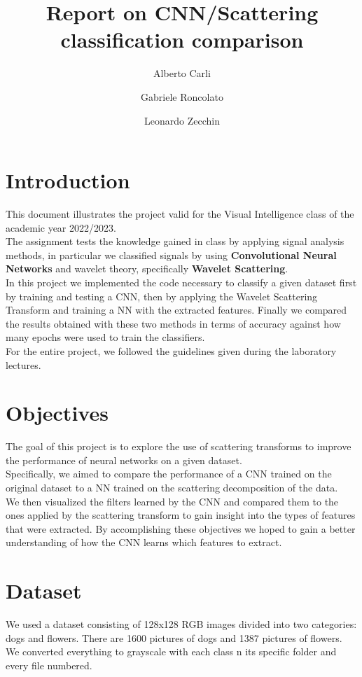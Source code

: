 \documentclass{report}
\title{Report on CNN/Scattering classification comparison}
\author{Alberto Carli \and Gabriele Roncolato \and Leonardo Zecchin }
\date{}
\begin{document}
\maketitle
\tableofcontents
\pagebreak

\chapter{Introduction}
This document illustrates the project valid for the Visual Intelligence class of the academic year 2022/2023. \\
The assignment tests the knowledge gained in class by applying signal analysis methods, in particular we classified signals by using \textbf{Convolutional Neural Networks} and wavelet theory, specifically  \textbf{Wavelet Scattering}. \\
In this project we implemented the code necessary to classify a given dataset first by training and testing a CNN, then by applying the Wavelet Scattering Transform and training a NN with the extracted features.
Finally we compared the results obtained with these two methods in terms of accuracy against how many epochs were used to train the classifiers. \\
For the entire project, we followed the guidelines given during the laboratory lectures.


\chapter{Objectives}
The goal of this project is to explore the use of scattering transforms to improve the performance of neural networks on a given dataset.\\
Specifically, we aimed to compare the performance of a CNN trained on the original dataset to a NN trained on the scattering decomposition of the data.\\

We then visualized the filters learned by the CNN and compared them to the ones applied by the scattering transform to gain insight into the types of features that were extracted.
By accomplishing these objectives we hoped to gain a better understanding of how the CNN learns which features to extract.

\chapter{Dataset}
We used a dataset consisting of 128x128 RGB images divided into two categories: dogs and flowers. There are 1600 pictures of dogs and 1387 pictures of flowers.
We converted everything to grayscale with each class n its specific folder and every file numbered.
\end{document}

